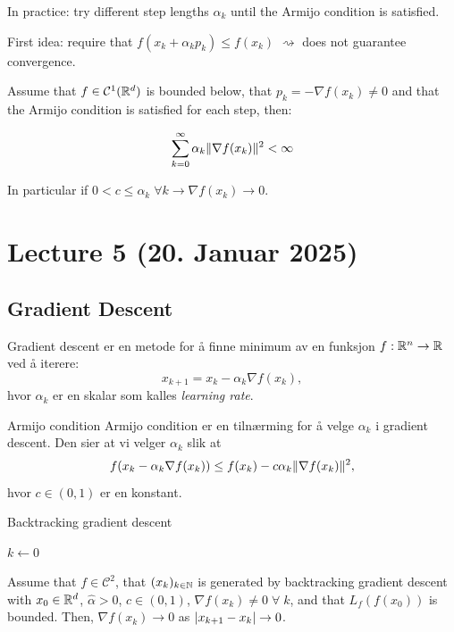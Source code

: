 In practice: try different step lengths  \(\alpha_k\) until the Armijo condition is satisfied.

First idea: require that  \(f(x_k + \alpha_k p_k) \leq f(x_k)\)  \(\rightsquigarrow\) does not guarantee convergence.

\begin{lemma}{}{}
  Assume that  \(f \in \mathcal{C}^1(\mathbb{R}^d)\) is bounded below, that  \(p_k = - \nabla f(x_k) \neq 0\) and that the Armijo condition is satisfied for each step, then:

  \[
    \sum_{k=0}^{\infty} \alpha_k \lVert\nabla f(x_k)\rVert^2 < \infty
  \]

  In particular if  \(0 < c \leq \alpha_k \; \forall k \rightarrow \nabla f(x_k) \rightarrow 0\).
\end{lemma}

\section{Lecture 5 (20. Januar 2025)}
\subsection*{Gradient Descent}


Gradient descent er en metode for å finne minimum av en funksjon  \(f: \mathbb{R}^n \to \mathbb{R}\) ved å iterere:
\[
  x_{k+1} = x_k - \alpha_k \nabla f(x_k),
\]
hvor  \(\alpha_k\) er en skalar som kalles \emph{learning rate}.

\begin{remark}{Armijo condition}{}
  Armijo condition er en tilnærming for å velge  \(\alpha_k\) i gradient descent. Den sier at vi velger  \(\alpha_k\) slik at
  \[
    f(x_k - \alpha_k \nabla f(x_k)) \leq f(x_k) - c \alpha_k \lVert\nabla f(x_k)\rVert^2,
  \]
  hvor  \(c \in (0, 1)\) er en konstant.
\end{remark}


\begin{algorithm}
  \caption{Backtracking gradient descent}
  \SetAlgoLined
  \(k \gets 0\)\;
\end{algorithm}


\begin{theorem}{}{}
  Assume that  \(f \in \mathcal{C}^2\), that  \((x_k)_{k \in \mathbb{N}}\)
  is generated by backtracking gradient descent with
  \(x_0 \in \mathbb{R}^d\),  \(\hat{\alpha} > 0\), \(c \in (0, 1)\),  \(\nabla f(x_k) \neq 0 \; \forall \; k\), and that
  \(L_f(f(x_0))\) is bounded. Then,  \(\nabla f(x_k) \to 0\) as  \(\lvert x_{k+1} - x_k\rvert \to 0\).
\end{theorem}

